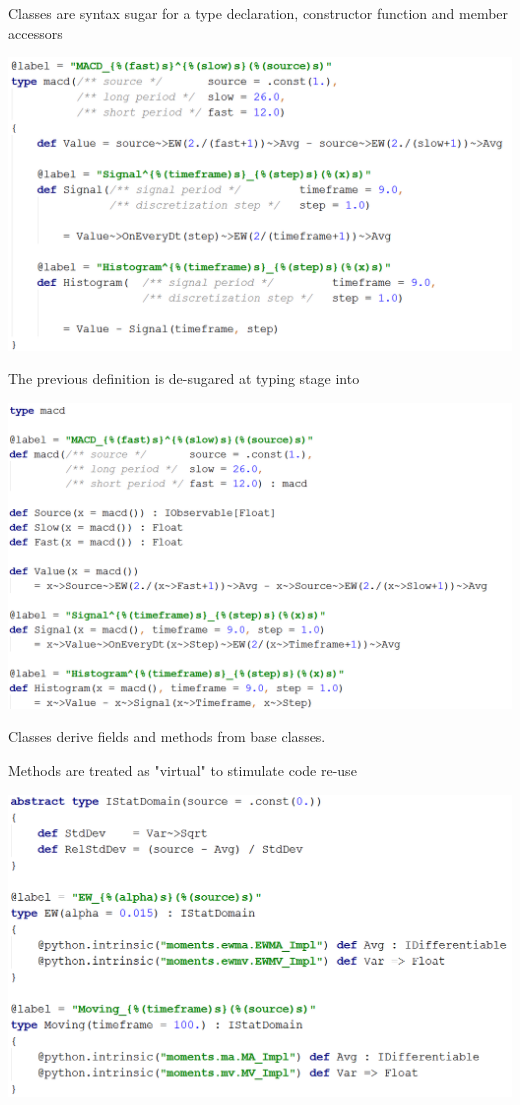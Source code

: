 \documentclass[a4paper,11pt]{article}
\begin{document}
Classes are syntax sugar for a type declaration, constructor function and member accessors

\centerline{\includegraphics[width=1\linewidth]{talks/macd.png}}

The previous definition is de-sugared at typing stage into

\centerline{\includegraphics[width=1\linewidth]{talks/macd_desugared.png}}

Classes derive fields and methods from base classes.

Methods are treated as "virtual" to stimulate code re-use

\centerline{\includegraphics[width=1\linewidth]{talks/moments.png}}
\end{document}
